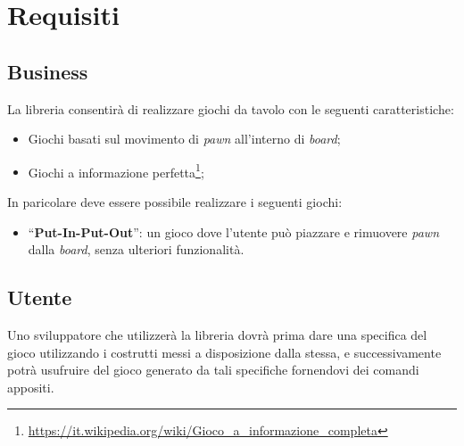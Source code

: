 \section{Requisiti}




\subsection{Business}

La libreria consentirà di realizzare giochi da tavolo con le seguenti caratteristiche:

\begin{itemize}
    \item Giochi basati sul movimento di \textit{pawn} all'interno di \textit{board};
    \item Giochi a informazione perfetta\footnote{\url{https://it.wikipedia.org/wiki/Gioco_a_informazione_completa}};
\end{itemize}

In paricolare deve essere possibile realizzare i seguenti giochi:

\begin{itemize}
    \item ``\textbf{Put-In-Put-Out}'': un gioco dove l'utente può piazzare e rimuovere \textit{pawn} dalla \textit{board}, senza ulteriori funzionalità.
\end{itemize}

\subsection{Utente}

Uno sviluppatore che utilizzerà la libreria dovrà prima dare una specifica del gioco utilizzando i costrutti messi a disposizione dalla stessa, e successivamente potrà usufruire del gioco generato da tali specifiche fornendovi dei comandi appositi.


